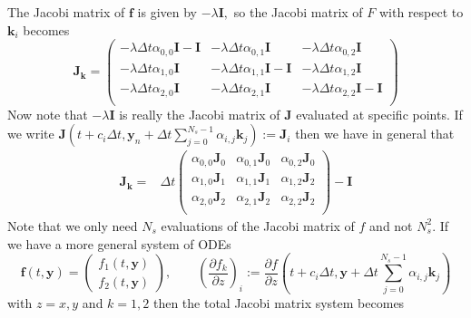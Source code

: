 \documentclass[10pt,a4paper]{article}
\newcommand{\bvec}[1]{\mathbf{#1}}
\begin{document}
The Jacobi matrix of $\bvec{f}$ is given by $-\lambda \bvec{I},$ so the Jacobi matrix of $F$ with respect to $\bvec{k}_i$ becomes
\begin{equation*}
  \bvec{J}_\bvec{k} = \begin{pmatrix}
    -\lambda \Delta t \alpha_{0,0}\bvec{I} - \bvec{I} & -\lambda \Delta t \alpha_{0,1}\bvec{I} & -\lambda \Delta t \alpha_{0,2}\bvec{I} \\
    -\lambda \Delta t \alpha_{1,0}\bvec{I}  & -\lambda \Delta t \alpha_{1,1}\bvec{I}  - \bvec{I} & -\lambda \Delta t \alpha_{1,2}\bvec{I} \\
    -\lambda \Delta t \alpha_{2,0}\bvec{I} & -\lambda \Delta t \alpha_{2,1}\bvec{I} & -\lambda \Delta t \alpha_{2,2}\bvec{I} - \bvec{I} \\
  \end{pmatrix}
\end{equation*}
Now note that $-\lambda \bvec{I}$ is really the Jacobi matrix of $\bvec{J}$ evaluated at specific points. If we write $\bvec{J}\left( t + c_i \Delta t, \bvec{y}_n + \Delta t \sum_{j=0}^{N_s-1} \alpha_{i,j} \bvec{k}_j \right) := \bvec{J}_{i}$ then we have in general that
\begin{align*}
  \bvec{J}_\bvec{k} =& \Delta t\begin{pmatrix}
      \alpha_{0,0} \bvec{J}_0 &  \alpha_{0,1} \bvec{J}_0 &  \alpha_{0,2} \bvec{J}_0 \\
     \alpha_{1,0} \bvec{J}_1  &  \alpha_{1,1} \bvec{J}_1   &  \alpha_{1,2} \bvec{J}_2 \\
     \alpha_{2,0} \bvec{J}_2 &  \alpha_{2,1} \bvec{J}_2 &  \alpha_{2,2} \bvec{J}_2  \\
   \end{pmatrix} - \bvec{I}
\end{align*}
Note that we only need $N_s$ evaluations of the Jacobi matrix of $f$ and not $N_s^2.$
If we have a more general system of ODEs
\begin{equation*}
  \bvec{f}(t,\bvec{y}) = \begin{pmatrix} f_1( t, \bvec{y} ) \\
    f_2( t, \bvec{y} )
  \end{pmatrix}, \qquad \left(\frac{\partial f_k}{\partial z}\right)_i := \frac{ \partial f}{\partial z}\left(t + c_i \Delta t, \bvec{y} + \Delta t \sum_{j=0}^{N_s-1}\alpha_{i,j} \bvec{k}_j\right)
\end{equation*}
with $z = x,y$ and $k = 1,2$ then the total Jacobi matrix system becomes
\end{document}
